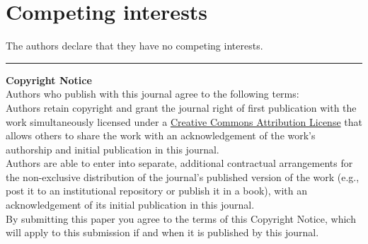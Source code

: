 \documentclass{josr}\usepackage[]{graphicx}\usepackage[]{color}
\begin{document}



\section*{Competing interests}
The authors declare that they have no competing interests.





%

\vspace{2cm}

\rule{\textwidth}{1pt}

{ \bf Copyright Notice} \\
Authors who publish with this journal agree to the following terms: \\

Authors retain copyright and grant the journal right of first publication with the work simultaneously licensed under a  \href{http://creativecommons.org/licenses/by/3.0/}{Creative Commons Attribution License} that allows others to share the work with an acknowledgement of the work's authorship and initial publication in this journal. \\

Authors are able to enter into separate, additional contractual arrangements for the non-exclusive distribution of the journal's published version of the work (e.g., post it to an institutional repository or publish it in a book), with an acknowledgement of its initial publication in this journal. \\

By submitting this paper you agree to the terms of this Copyright Notice, which will apply to this submission if and when it is published by this journal.
\end{document}
